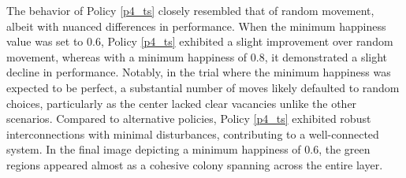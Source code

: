 \documentclass[11pt]{article}
\begin{document}
	\vspace{2em} %
	The behavior of Policy \ref{p4_ts} closely resembled that of random movement, albeit with nuanced differences in performance. When the minimum happiness value was set to 0.6, Policy \ref{p4_ts} exhibited a slight improvement over random movement, whereas with a minimum happiness of 0.8, it demonstrated a slight decline in performance. Notably, in the trial where the minimum happiness was expected to be perfect, a substantial number of moves likely defaulted to random choices, particularly as the center lacked clear vacancies unlike the other scenarios.
	Compared to alternative policies, Policy \ref{p4_ts} exhibited robust interconnections with minimal disturbances, contributing to a well-connected system. In the final image depicting a minimum happiness of 0.6, the green regions appeared almost as a cohesive colony spanning across the entire layer.
\end{document}
